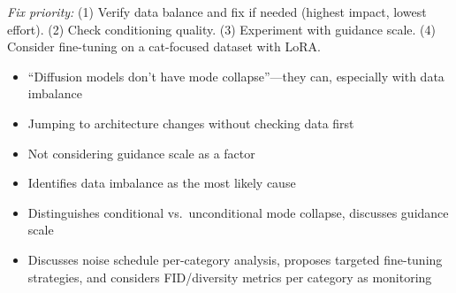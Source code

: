 \begin{interviewq}
\textit{Fix priority:} (1) Verify data balance and fix if needed (highest impact, lowest effort). (2) Check conditioning quality. (3) Experiment with guidance scale. (4) Consider fine-tuning on a cat-focused dataset with LoRA.

\redflags
\begin{itemize}
    \item ``Diffusion models don't have mode collapse''---they can, especially with data imbalance
    \item Jumping to architecture changes without checking data first
    \item Not considering guidance scale as a factor
\end{itemize}


\goodgreat
\begin{itemize}
    \item {} Identifies data imbalance as the most likely cause
    \item {} Distinguishes conditional vs.\ unconditional mode collapse, discusses guidance scale
    \item {} Discusses noise schedule per-category analysis, proposes targeted fine-tuning strategies, and considers FID/diversity metrics per category as monitoring
\end{itemize}

\end{interviewq}

